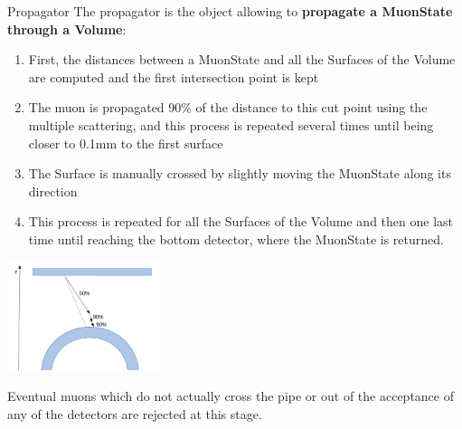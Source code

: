 \documentclass[handout,8 pt]{beamer}
\begin{document}
\begin{frame}{Propagator}
\justifying
The propagator is the object allowing to \textbf{propagate a MuonState through a Volume}: \vfill

\begin{minipage}[c]{.59\textwidth}
\begin{enumerate}
\justifying
\item First, the distances between a MuonState and all the Surfaces of the Volume are computed and the first intersection point is kept \vspace{5pt}
\item The muon is propagated 90\% of the distance to this cut point using the multiple scattering, and this process is repeated several times until being closer to 0.1mm to the first surface \vspace{5pt}
\item The Surface is manually crossed by slightly moving the MuonState along its direction \vspace{5pt}
\item This process is repeated for all the Surfaces of the Volume and then one last time until reaching the bottom detector, where the MuonState is returned.
\end{enumerate}
\end{minipage}
\begin{minipage}[c]{.40\textwidth}
\includegraphics[width=4.5cm, height=3.2cm]{figs/propagation.png}
\end{minipage} \vfill

Eventual muons which do not actually cross the pipe or out of the acceptance of any of the detectors are rejected at this stage. \vfill
\end{frame}
\end{document}
